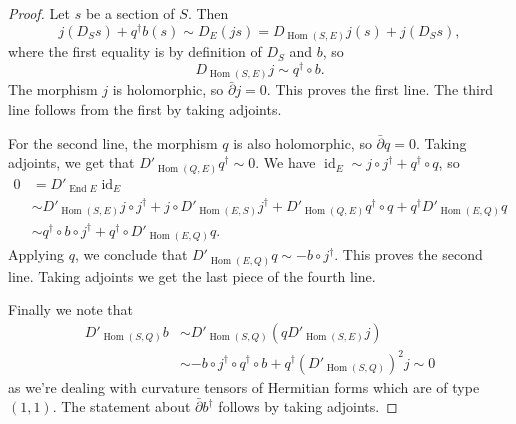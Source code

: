 \documentclass[10pt,a4paper]{article}
\newtheorem*{proof}{Proof}
\DeclareMathOperator{\End}{End}
\DeclareMathOperator{\Hom}{Hom}
\DeclareMathOperator{\id}{id}
\begin{document}
\begin{proof}
Let $s$ be a section of $S$. Then
\[
j(D_S s) + q^\dagger b(s)
\sim D_E(js)
= D_{\Hom(S,E)}j (s) + j(D_S s),
\]
where the first equality is by definition of $D_S$ and $b$, so
\[
D_{\Hom(S,E)}j \sim q^\dagger \circ b.
\]
The morphism $j$ is holomorphic, so $\bar\partial j = 0$. This proves the first line. The third line follows from the first by taking adjoints.


For the second line, the morphism $q$ is also holomorphic, so $\bar\partial q = 0$. Taking adjoints, we get that $D'_{\Hom(Q,E)} q^\dagger \sim 0$.
We have $\id_E \sim j \circ j^\dagger + q^\dagger \circ q$, so
\begin{align*}
0
&= D'_{\End E} \id_E
\\
&\sim D'_{\Hom(S,E)} j \circ j^\dagger + j \circ D'_{\Hom(E,S)}j^\dagger
+ D'_{\Hom(Q,E)}q^\dagger \circ q + q^\dagger D'_{\Hom(E,Q)} q
\\
&\sim q^\dagger \circ b \circ j^\dagger + q^\dagger \circ D'_{\Hom(E,Q)}q.
\end{align*}
Applying $q$, we conclude that $D'_{\Hom(E,Q)}q \sim - b \circ j^\dagger$. This proves the second line. Taking adjoints we get the last piece of the fourth line.

Finally we note that
\begin{align*}
D'_{\Hom(S,Q)} b
&\sim D'_{\Hom(S,Q)} (q D'_{\Hom(S,E)}j)
\\
&\sim - b \circ j^\dagger \circ q^\dagger \circ b
+ q^\dagger (D'_{\Hom(S,Q)})^2 j
\sim 0
\end{align*}
as we're dealing with curvature tensors of Hermitian forms which are of type $(1,1)$. The statement about $\bar\partial b^\dagger$ follows by taking adjoints.
\end{proof}
\end{document}
